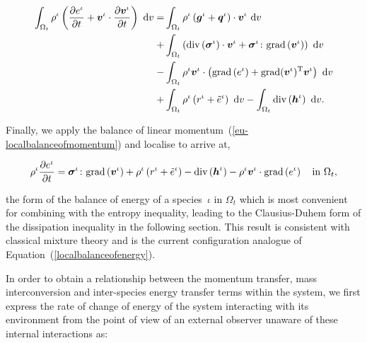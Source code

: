\begin{equation*}
\begin{split}
\int_{\Omega_{t}} \rho^{\iota} \left(\frac{\partial
  e^{\iota}}{\partial t} + \mbox{\boldmath$ v$}^{\iota}\cdot\frac{\partial
  \mbox{\boldmath$ v$}^{\iota}}{\partial t}\right)\ \mathrm{d}v = & \int_{\Omega_{t}}
\rho^{\iota} \left(\mbox{\boldmath$ g$}^{\iota} +
\mbox{\boldmath$ q$}^{\iota}\right)\cdot\mbox{\boldmath$ v$}^{\iota}\ \mathrm{d}v\\ + &
\int_{\Omega_{t}}
\left(\mathrm{div}\left(\mbox{\boldmath$\sigma$}^{\iota}\right)\cdot\mbox{\boldmath$ v$}^{\iota} +
\mbox{\boldmath$\sigma$}^{\iota}\colon\mathrm{grad}\left(\mbox{\boldmath$ v$}^{\iota}\right)
\right)\ \mathrm{d}v\\ - & \int_{\Omega_{t}} \rho^{\iota}\mbox{\boldmath$ v$}^{\iota}
\cdot \left(\mathrm{grad}\left(e^{\iota}\right)
+\mathrm{grad}(\mbox{\boldmath$ v$}^{\iota})^{\mathrm{T}}
\mbox{\boldmath$ v$}^{\iota}\right)\ \mathrm{d}v \\ + &\int_{\Omega_{t}} \rho^{\iota}
\left(r^{\iota} + \tilde{e}^{\iota} \right)\ \mathrm{d}v -
\int_{\Omega_{t}} \mathrm{div}\left(\mbox{\boldmath$ h$}^{\iota}\right)\ \mathrm{d}v.
\end{split}
\end{equation*}

\noindent Finally, we apply the balance of linear
momentum~(\ref{eu-localbalanceofmomentum}) and localise to arrive at,

\begin{equation}
\rho^{\iota} \frac{\partial e^{\iota}}{\partial t} =
\mbox{\boldmath$\sigma$}^{\iota}\colon\mathrm{grad}\left(\mbox{\boldmath$ v$}^{\iota}\right) +
\rho^{\iota} \left(r^{\iota} + \tilde{e}^{\iota} \right) -
\mathrm{div}\left(\mbox{\boldmath$ h$}^{\iota}\right) - \rho^{\iota}\mbox{\boldmath$ v$}^{\iota} \cdot
\mathrm{grad} \left(e^{\iota}\right) \quad
\mathrm{in}\ \Omega_{t},
\label{eu-localbalanceofenergy}
\end{equation}

\noindent the form of the balance of energy of a species~$\iota$ in
$\Omega_{t}$ which is most convenient for combining with the entropy
inequality, leading to the Clausius-Duhem form of the dissipation
inequality in the following section.  This result is consistent with
classical mixture theory \citep{TruesdellToupin:60} and is the current
configuration analogue of Equation~(\ref{localbalanceofenergy}).

In order to obtain a relationship between the momentum transfer, mass
interconversion and inter-species energy transfer terms within the
system, we first express the rate of change of energy of the system
interacting with its environment from the point of view of an external
observer unaware of these internal interactions as:


